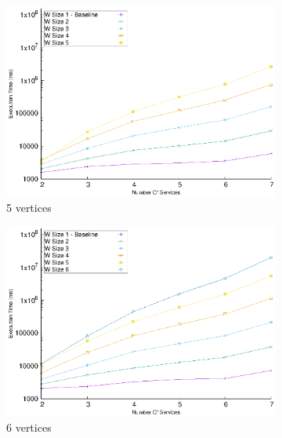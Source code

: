 \begin{figure}[!t]
\begin{subfigure}{0.45\textwidth}
      \includegraphics[width=\textwidth]{Images/graphs/window_time_performance_qualitative_n7_s7_50_80_n5}
      \caption{5 vertices}
      \label{fig:time_window_perce_wide_5n}
    \end{subfigure}
    \hfill
    \begin{subfigure}{0.45\textwidth}
      \includegraphics[width=\textwidth]{Images/graphs/window_time_performance_qualitative_n7_s7_50_80_n6}
      \caption{6 vertices}
      \label{fig:time_window_perce_wide_6n}
    \end{subfigure}
    \begin{subfigure}{0.45\textwidth}

\end{subfigure}
\end{figure}
